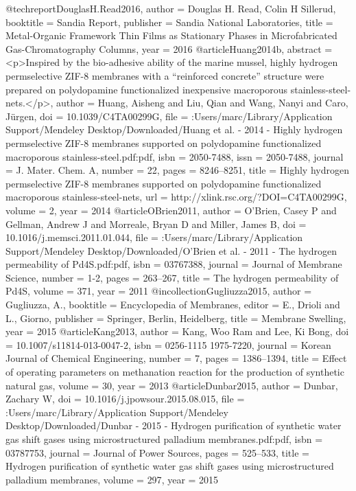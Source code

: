 @techreport{DouglasH.Read2016,
author = {{Douglas H. Read}, Colin H Sillerud},
booktitle = {Sandia Report},
publisher = {Sandia National Laboratories},
title = {{Metal-Organic Framework Thin Films as Stationary Phases in Microfabricated Gas-Chromatography Columns}},
year = {2016}
}
@article{Huang2014b,
abstract = {{\textless}p{\textgreater}Inspired by the bio-adhesive ability of the marine mussel, highly hydrogen permselective ZIF-8 membranes with a “reinforced concrete” structure were prepared on polydopamine functionalized inexpensive macroporous stainless-steel-nets.{\textless}/p{\textgreater}},
author = {Huang, Aisheng and Liu, Qian and Wang, Nanyi and Caro, J{\"{u}}rgen},
doi = {10.1039/C4TA00299G},
file = {:Users/marc/Library/Application Support/Mendeley Desktop/Downloaded/Huang et al. - 2014 - Highly hydrogen permselective ZIF-8 membranes supported on polydopamine functionalized macroporous stainless-steel.pdf:pdf},
isbn = {2050-7488},
issn = {2050-7488},
journal = {J. Mater. Chem. A},
number = {22},
pages = {8246--8251},
title = {{Highly hydrogen permselective ZIF-8 membranes supported on polydopamine functionalized macroporous stainless-steel-nets}},
url = {http://xlink.rsc.org/?DOI=C4TA00299G},
volume = {2},
year = {2014}
}
@article{OBrien2011,
author = {O'Brien, Casey P and Gellman, Andrew J and Morreale, Bryan D and Miller, James B},
doi = {10.1016/j.memsci.2011.01.044},
file = {:Users/marc/Library/Application Support/Mendeley Desktop/Downloaded/O'Brien et al. - 2011 - The hydrogen permeability of Pd4S.pdf:pdf},
isbn = {03767388},
journal = {Journal of Membrane Science},
number = {1-2},
pages = {263--267},
title = {{The hydrogen permeability of Pd4S}},
volume = {371},
year = {2011}
}
@incollection{Gugliuzza2015,
author = {Gugliuzza, A.},
booktitle = {Encyclopedia of Membranes},
editor = {E., Drioli and L., Giorno},
publisher = {Springer, Berlin, Heidelberg},
title = {{Membrane Swelling}},
year = {2015}
}
@article{Kang2013,
author = {Kang, Woo Ram and Lee, Ki Bong},
doi = {10.1007/s11814-013-0047-2},
isbn = {0256-1115
1975-7220},
journal = {Korean Journal of Chemical Engineering},
number = {7},
pages = {1386--1394},
title = {{Effect of operating parameters on methanation reaction for the production of synthetic natural gas}},
volume = {30},
year = {2013}
}
@article{Dunbar2015,
author = {Dunbar, Zachary W},
doi = {10.1016/j.jpowsour.2015.08.015},
file = {:Users/marc/Library/Application Support/Mendeley Desktop/Downloaded/Dunbar - 2015 - Hydrogen purification of synthetic water gas shift gases using microstructured palladium membranes.pdf:pdf},
isbn = {03787753},
journal = {Journal of Power Sources},
pages = {525--533},
title = {{Hydrogen purification of synthetic water gas shift gases using microstructured palladium membranes}},
volume = {297},
year = {2015}
}
